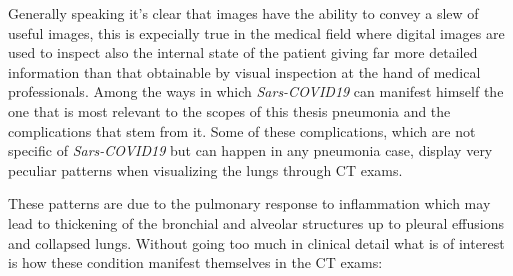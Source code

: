 Generally speaking it's clear that images have the ability to convey a slew of useful images, this is expecially true in the medical field where digital images are used to inspect also the internal state of the patient giving far more detailed information than that obtainable by visual inspection at the hand of medical professionals. Among the ways in which \textit{Sars-COVID19} can manifest himself the one that is most relevant to the scopes of this thesis pneumonia and the complications that stem from it. Some of these complications, which are not specific of \textit{Sars-COVID19} but can happen in any pneumonia case, display very peculiar patterns when visualizing the lungs through CT exams.

These patterns are due to the pulmonary response to inflammation which may lead to thickening of the bronchial and alveolar structures up to pleural effusions and collapsed lungs. Without going too much in clinical detail what is of interest is how these condition manifest themselves in the CT exams:

